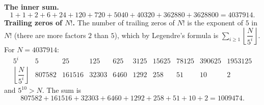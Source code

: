 \textbf{The inner sum.}
\[
1+1+2+6+24+120+720+5040+40320+362880+3628800=4037914 .
\]
\textbf{Trailing zeros of $N!$.} The number of trailing zeros of $N!$ is the exponent of $5$ in $N!$ (there are more factors $2$ than $5$), which by Legendre's formula is $\sum_{i\ge1}\left\lfloor\dfrac {N}{5^i}\right\rfloor$. For $N=4037914$:
\[
\begin{array}{c|ccccccccc}
5^i&5&25&125&625&3125&15625&78125&390625&1953125\\\hline
\left\lfloor\dfrac {N}{5^i}\right\rfloor&807582&161516&32303&6460&1292&258&51&10&2
\end{array}
\]
and $5^{10}>N$. The sum is
\[
807582+161516+32303+6460+1292+258+51+10+2=\boxed{1009474}.
\]
